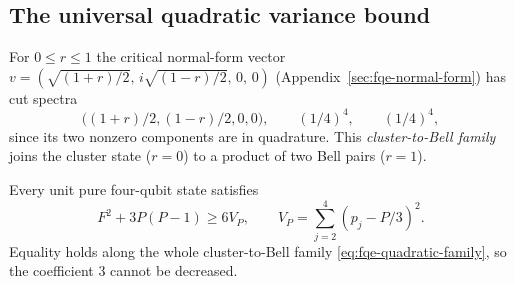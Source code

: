 \subsection{The universal quadratic variance bound}\label{sec:fqe-quadratic-certificate}
For $0\le r\le1$ the critical normal-form vector $v=(\sqrt{(1+r)/2},\,i\sqrt{(1-r)/2},\,0,\,0)$
(Appendix~\ref{sec:fqe-normal-form}) has cut spectra
\[
\bigl((1+r)/2,(1-r)/2,0,0\bigr),\qquad(1/4)^4,\qquad(1/4)^4,
\tag{QF}\label{eq:fqe-quadratic-family}
\]
since its two nonzero components are in quadrature. This \emph{cluster-to-Bell family} joins the cluster
state ($r=0$) to a product of two Bell pairs ($r=1$).


\begin{theorem}
\label{thm:fqe-sharp-quadratic-variance}
Every unit pure four-qubit state satisfies
\[
\boxed{\qquad F^2+3P(P-1)\ge6V_P,
\qquad V_P=\sum_{j=2}^4(p_j-P/3)^2.\qquad}
\tag{QV}\label{eq:fqe-quadratic-variance}
\]
Equality holds along the whole cluster-to-Bell family \eqref{eq:fqe-quadratic-family}, so the
coefficient $3$ cannot be decreased.
\end{theorem}

